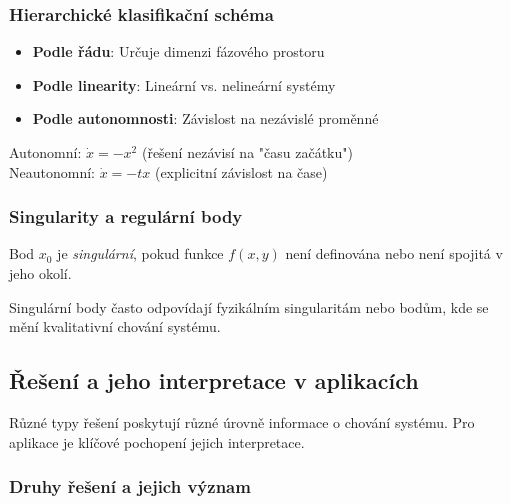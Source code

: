 \subsubsection{Hierarchické klasifikační schéma}

\begin{itemize}
\item \textbf{Podle řádu}: Určuje dimenzi fázového prostoru
\item \textbf{Podle linearity}: Lineární vs. nelineární systémy
\item \textbf{Podle autonomnosti}: Závislost na nezávislé proměnné
\end{itemize}

\begin{example}
Autonomní: $\dot{x} = -x^2$ (řešení nezávisí na "času začátku") \\
Neautonomní: $\dot{x} = -tx$ (explicitní závislost na čase)
\end{example}



\subsubsection{Singularity a regulární body}

\begin{definition}
Bod $x_0$ je \emph{singulární}, pokud funkce $f(x,y)$ není definována nebo není spojitá v jeho okolí.
\end{definition}

\begin{intuition}
Singulární body často odpovídají fyzikálním singularitám nebo bodům, kde se mění kvalitativní chování systému.
\end{intuition}

\spc

\subsection{Řešení a jeho interpretace v aplikacích}

\begin{motivation}
Různé typy řešení poskytují různé úrovně informace o chování systému. Pro aplikace je klíčové pochopení jejich interpretace.
\end{motivation}

\subsubsection{Druhy řešení a jejich význam}

